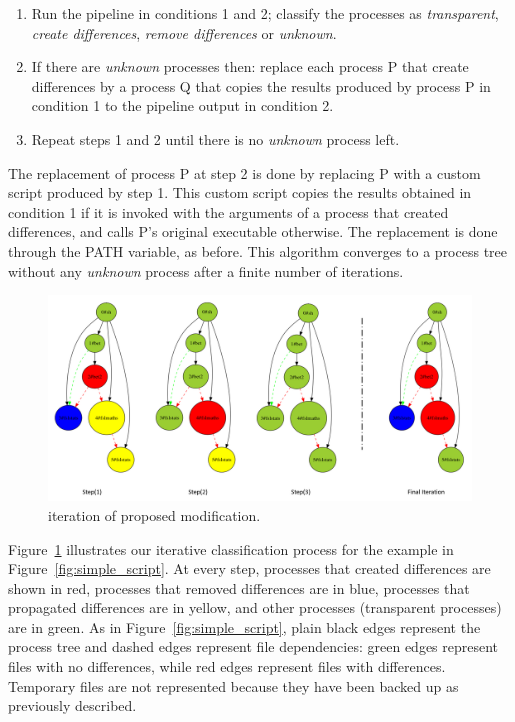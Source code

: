\documentclass[a4paper,num-refs]{oup-contemporary}
\begin{document}
\begin{enumerate}
  \item Run the pipeline in conditions 1 and 2; classify the
    processes as \emph{transparent}, \emph{create differences},
    \emph{remove differences} or \emph{unknown}.
  \item If there are \emph{unknown} processes then: replace each 
  process P that create differences by a process Q that copies the results 
  produced by process P in condition 1 to the pipeline output in 
  condition 2. 
  \item Repeat steps 1 and 2 until there is no \emph{unknown} process left.
\end{enumerate}

The replacement of process P at step 2 is done by replacing P with a 
custom script produced by step 1. This custom script copies the results 
obtained in condition 1 if it is invoked with the arguments of a 
process that created differences, and calls P's original executable 
otherwise. The replacement is done through the PATH variable, as 
before. This algorithm converges to a process tree without any 
\emph{unknown} process after a finite number of iterations.

\begin{figure}
  \centering
  \includegraphics[width=\columnwidth]{images/iterative_modif}
  \caption{iteration of proposed modification.}
  \label{fig:iterations}
\end{figure}

Figure~\ref{fig:iterations} illustrates our iterative classification 
process for the example in Figure~\ref{fig:simple_script}. At every 
step, processes that created differences are shown in red, processes that 
removed differences are in blue, processes that propagated differences are in 
yellow, and other processes (transparent processes) are in green. As in 
Figure~\ref{fig:simple_script}, plain black edges represent the process 
tree and dashed edges represent file dependencies: green edges 
represent files with no differences, while red edges represent files with 
differences. Temporary files are not represented because they have been 
backed up as previously described.
\end{document}
